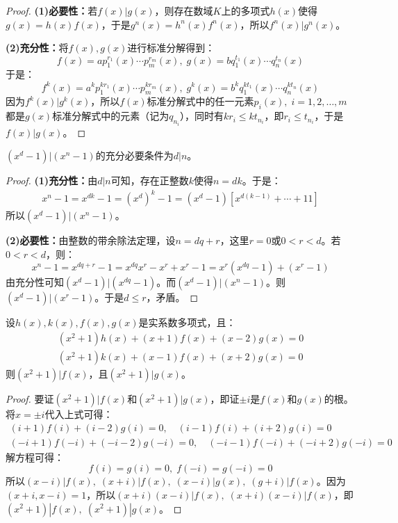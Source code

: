 \begin{proof}
	\textbf{(1)必要性：}若$f(x)|g(x)$，则存在数域$K$上的多项式$h(x)$使得$g(x)=h(x)f(x)$，于是$g^n(x)=h^n(x)f^n(x)$，所以$f^n(x)|g^n(x)$。\par
	\textbf{(2)充分性：}将$f(x),g(x)$进行标准分解得到：
	\begin{equation*}
		f(x)=ap_1^{r_1}(x)\cdots p_m^{r_m}(x),\;
		g(x)=bq_1^{t_1}(x)\cdots q_n^{t_n}(x)
	\end{equation*}
	于是：
	\begin{equation*}
		f^k(x)=a^kp_1^{kr_1}(x)\cdots p_m^{kr_m}(x),\;
		g^k(x)=b^kq_1^{kt_1}(x)\cdots q_n^{kt_n}(x)
	\end{equation*}
	因为$f^k(x)|g^k(x)$，所以$f(x)$标准分解式中的任一元素$p_i(x),\;i=1,2,\dots,m$都是$g(x)$标准分解式中的元素（记为$q_{n_i}$），同时有$kr_i\leqslant kt_{n_i}$，即$r_i\leqslant t_{n_i}$，于是$f(x)|g(x)$。
\end{proof}
\begin{theorem}
	$(x^d-1)|(x^n-1)$的充分必要条件为$d|n$。
\end{theorem}
\begin{proof}
	\textbf{(1)充分性：}由$d|n$可知，存在正整数$k$使得$n=dk$。于是：
	\begin{align*}
		x^n-1=x^{dk}-1=\left(x^d\right)^k-1=(x^d-1)[x^{d(k-1)}+\cdots+11]
	\end{align*}
	所以$(x^d-1)|(x^n-1)$。\par
	\textbf{(2)必要性：}由整数的带余除法定理，设$n=dq+r$，这里$r=0$或$0<r<d$。若$0<r<d$，则：
	\begin{equation*}
		x^n-1=x^{dq+r}-1=x^{dq}x^r-x^r+x^r-1=x^r(x^{dq}-1)+(x^r-1)
	\end{equation*}
	由充分性可知$(x^d-1)|(x^{dq}-1)$。而$(x^d-1)|(x^n-1)$。则$(x^d-1)|(x^r-1)$。于是$d\leqslant r$，矛盾。
\end{proof}
\begin{theorem}
	设$h(x),k(x),f(x),g(x)$是实系数多项式，且：
	\begin{gather*}
		(x^2+1)h(x)+(x+1)f(x)+(x-2)g(x)=0 \\
		(x^2+1)k(x)+(x-1)f(x)+(x+2)g(x)=0
	\end{gather*}
	则$(x^2+1)|f(x)$，且$(x^2+1)|g(x)$。
\end{theorem}
\begin{proof}
	要证$(x^2+1)|f(x)$和$(x^2+1)|g(x)$，即证$\pm i$是$f(x)$和$g(x)$的根。将$x=\pm i$代入上式可得：
	\begin{gather*}
		(i+1)f(i)+(i-2)g(i)=0,\quad(i-1)f(i)+(i+2)g(i)=0 \\
		(-i+1)f(-i)+(-i-2)g(-i)=0,\quad(-i-1)f(-i)+(-i+2)g(-i)=0
	\end{gather*}
	解方程可得：
	\begin{equation*}
		f(i)=g(i)=0,\;f(-i)=g(-i)=0
	\end{equation*}
	所以$(x-i)|f(x),\;(x+i)|f(x),\;(x-i)|g(x),\;(g+i)|f(x)$。因为$(x+i,x-i)=1$，所以$(x+i)(x-i)|f(x),\;(x+i)(x-i)|f(x)$，即$(x^2+1)|f(x),\;(x^2+1)|g(x)$。
\end{proof}
